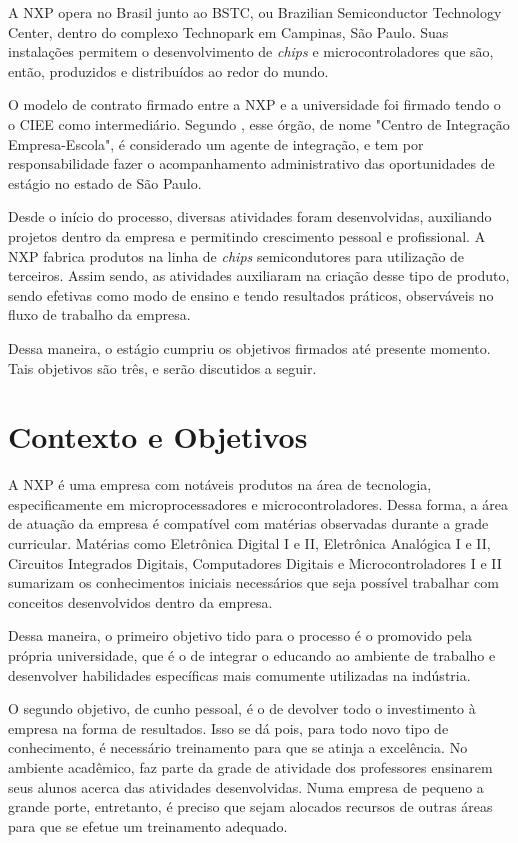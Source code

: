 \documentclass[
	12pt,				%
    oneside,			%
	a4paper,			%
	english,			%
	french,				%
	spanish,			%
	brazil				%
	]{abntex2}
\begin{document}
A NXP opera no Brasil junto ao BSTC, ou Brazilian Semiconductor Technology Center, dentro do complexo Technopark em Campinas, São Paulo. Suas instalações permitem o desenvolvimento de \textit{chips} e microcontroladores que são, então, produzidos e distribuídos ao redor do mundo.

O modelo de contrato firmado entre a NXP e a universidade foi firmado tendo o o CIEE como intermediário. Segundo \citeauthor{Cartilha}, esse órgão, de nome "Centro de Integração Empresa-Escola", é considerado um agente de integração, e tem por responsabilidade fazer o acompanhamento administrativo das oportunidades de estágio no estado de São Paulo.

Desde o início do processo, diversas atividades foram desenvolvidas, auxiliando projetos dentro da empresa e permitindo crescimento pessoal e profissional. A NXP fabrica produtos na linha de \textit{chips} semicondutores para utilização de terceiros. Assim sendo, as atividades auxiliaram na criação desse tipo de produto, sendo efetivas como modo de ensino e tendo resultados práticos, observáveis no fluxo de trabalho da empresa.

Dessa maneira, o estágio cumpriu os objetivos firmados até presente momento. Tais objetivos são três, e serão discutidos a seguir.

\section{Contexto e Objetivos}

A NXP é uma empresa com notáveis produtos na área de tecnologia, especificamente em microprocessadores e microcontroladores. Dessa forma, a área de atuação da empresa é compatível com matérias observadas durante a grade curricular. Matérias como Eletrônica Digital I e II, Eletrônica Analógica I e II, Circuitos Integrados Digitais, Computadores Digitais e Microcontroladores I e II sumarizam os conhecimentos iniciais necessários que seja possível trabalhar com conceitos desenvolvidos dentro da empresa.

Dessa maneira, o primeiro objetivo tido para o processo é o promovido pela própria universidade, que é o de integrar o educando ao ambiente de trabalho e desenvolver habilidades específicas mais comumente utilizadas na indústria.

O segundo objetivo, de cunho pessoal, é o de devolver todo o investimento à empresa na forma de resultados. Isso se dá pois, para todo novo tipo de conhecimento, é necessário treinamento para que se atinja a excelência. No ambiente acadêmico, faz parte da grade de atividade dos professores ensinarem seus alunos acerca das atividades desenvolvidas. Numa empresa de pequeno a grande porte, entretanto, é preciso que sejam alocados recursos de outras áreas para que se efetue um treinamento adequado. 
\end{document}
